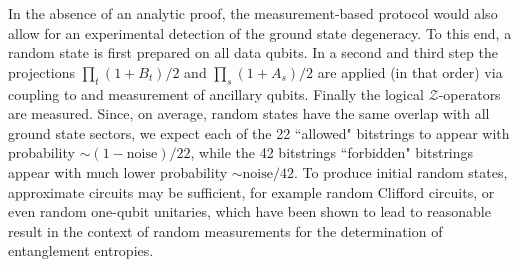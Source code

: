 \documentclass[nofootinbib,pra,twocolumn,showpacs,superscriptaddress,notitlepage,amsmath]{revtex4-2} %
\begin{document}
In the absence of an analytic proof, the measurement-based protocol would also allow for an experimental detection of the ground state degeneracy. To this end, a random state is first prepared on all data qubits. In a second and third step the projections $\prod_t (1+B_t)/2$ and $\prod_s (1+A_s)/2$ are applied (in that order) via coupling to and measurement of ancillary qubits. Finally the logical $\mathcal{Z}$-operators are measured. Since, on average, random states have the same overlap with all ground state sectors, we expect each of the 22 ``allowed" bitstrings to appear with probability $\sim(1-\text{noise})/22$, while the 42 bitstrings ``forbidden" bitstrings appear with much lower probability $\sim \text{noise}/42$. To produce initial random states, approximate circuits may be sufficient, for example random Clifford circuits, or even random one-qubit unitaries, which have been shown to lead to reasonable result in the context of random measurements for the determination of entanglement entropies.
\end{document}
